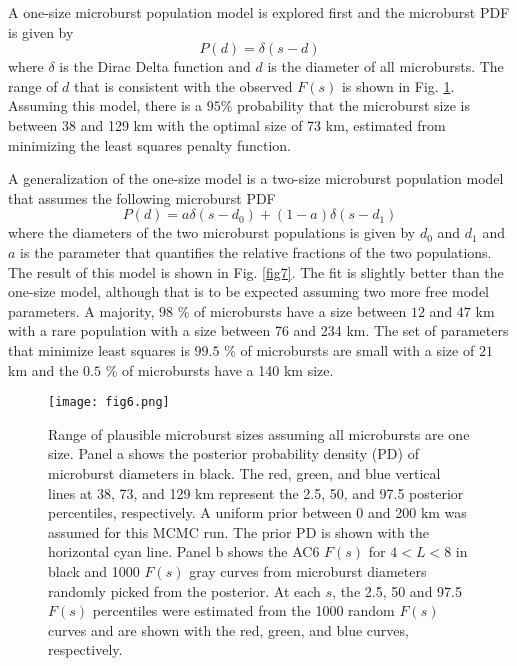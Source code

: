 \documentclass[draft]{agujournal2019}
\begin{document}
A one-size microburst population model is explored first and the microburst PDF is given by 
\begin{equation}
P(d) = \delta(s-d)
\end{equation} where $\delta$ is the Dirac Delta function and $d$ is the diameter of all microbursts. The range of $d$ that is consistent with the observed $F(s)$ is shown in Fig. \ref{fig6}. Assuming this model, there is a $95 \%$ probability that the microburst size is between 38 and 129 km with the optimal size of 73 km, estimated from minimizing the least squares penalty function. 

A generalization of the one-size model is a two-size microburst population model that assumes the following microburst PDF
\begin{equation}
P(d) = a \delta(s-d_0) + (1-a)\delta(s-d_1)
\end{equation} where the diameters of the two microburst populations is given by $d_0$ and $d_1$ and $a$ is the parameter that quantifies the relative fractions of the two populations. The result of this model is shown in Fig. \ref{fig7}. The fit is slightly better than the one-size model, although that is to be expected assuming two more free model parameters. A majority, $98$ \% of microbursts have a size between $12$ and $47$ km with a rare population with a size between 76 and 234 km. The set of parameters that minimize least squares is $99.5$ \% of microbursts are small with a size of $21$ km and the $0.5$ \% of microbursts have a 140 km size.

\begin{figure}
\texttt{[image: fig6.png]}
\caption{Range of plausible microburst sizes assuming all microbursts are one size. Panel a shows the posterior probability density (PD) of microburst diameters in black. The red, green, and blue vertical lines at 38, 73, and 129 km represent the 2.5, 50, and 97.5 posterior percentiles, respectively. A uniform prior between 0 and 200 km was assumed for this MCMC run. The prior PD is shown with the horizontal cyan line. Panel b shows the AC6 $F(s)$ for $4 < L < 8$ in black and 1000 $F(s)$ gray curves from microburst diameters randomly picked from the posterior. At each $s$, the 2.5, 50 and 97.5 $F(s)$ percentiles were estimated from the 1000 random $F(s)$ curves and are shown with the red, green, and blue curves, respectively.} 
\label{fig6}
\end{figure}
\end{document}
